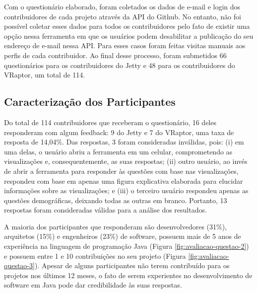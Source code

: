 Com o questionário elaborado, foram coletados os dados de e-mail e login dos contribuidores de cada projeto através da API do Github. No entanto, não foi possível coletar esses dados para todos os contribuidores pelo fato de existir uma opção nessa ferramenta em que os usuários podem desabilitar a publicação do seu endereço de e-mail nessa API. Para esses casos foram feitas visitas manuais aos perfis de cada contribuidor. Ao final desse processo, foram submetidos 66 questionários para os contribuidores do Jetty e 48 para os contribuidores do VRaptor, um total de 114.

\subsection{Caracterização dos Participantes} \label{subsec:avaliacao-caracterizacao-participantes}

Do total de 114 contribuidores que receberam o questionário, 16 deles responderam com algum feedback: 9 do Jetty e 7 do VRaptor, uma taxa de resposta de 14,04\%. Das respostas, 3 foram consideradas inválidas, pois: (i) em uma delas, o usuário abriu a ferramenta em um celular, comprometendo as visualizações e, consequentemente, as suas respostas; (ii) outro usuário, ao invés de abrir a ferramenta para responder às questões com base nas visualizações, respondeu com base em apenas uma figura explicativa elaborada para elucidar informações sobre as visualizações; e (iii) o terceiro usuário respondeu apenas as questões demográficas, deixando todas as outras em branco. Portanto, 13 respostas foram consideradas válidas para a análise dos resultados.

A maioria dos participantes que responderam são desenvolvedores (31\%), arquitetos (15\%) e engenheiros (23\%) de software, possuem mais de 5 anos de experiência na linguagem de programação Java (Figura \ref{fig:avaliacao-questao-2}) e possuem entre 1 e 10 contribuições no seu projeto (Figura \ref{fig:avaliacao-questao-3}). Apesar de alguns participantes não terem contribuído para os projetos nos últimos 12 meses, o fato de serem experientes no desenvolvimento de software em Java pode dar credibilidade às suas respostas.

